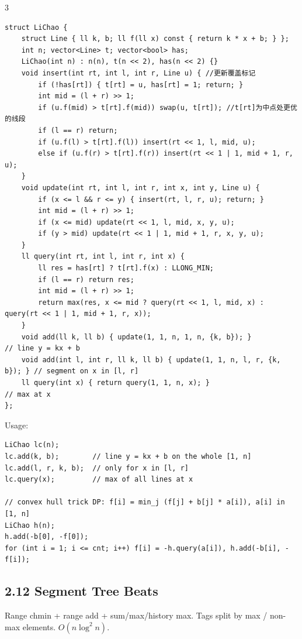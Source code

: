 \documentclass[8pt]{extarticle}
\begin{document}
\begin{multicols*}{3}
\begin{lstlisting}
struct LiChao {
    struct Line { ll k, b; ll f(ll x) const { return k * x + b; } };
    int n; vector<Line> t; vector<bool> has;
    LiChao(int n) : n(n), t(n << 2), has(n << 2) {}
    void insert(int rt, int l, int r, Line u) { //更新覆盖标记
        if (!has[rt]) { t[rt] = u, has[rt] = 1; return; }
        int mid = (l + r) >> 1;
        if (u.f(mid) > t[rt].f(mid)) swap(u, t[rt]); //t[rt]为中点处更优的线段
        if (l == r) return;
        if (u.f(l) > t[rt].f(l)) insert(rt << 1, l, mid, u);
        else if (u.f(r) > t[rt].f(r)) insert(rt << 1 | 1, mid + 1, r, u);
    }
    void update(int rt, int l, int r, int x, int y, Line u) {
        if (x <= l && r <= y) { insert(rt, l, r, u); return; }
        int mid = (l + r) >> 1;
        if (x <= mid) update(rt << 1, l, mid, x, y, u);
        if (y > mid) update(rt << 1 | 1, mid + 1, r, x, y, u);
    }
    ll query(int rt, int l, int r, int x) {
        ll res = has[rt] ? t[rt].f(x) : LLONG_MIN;
        if (l == r) return res;
        int mid = (l + r) >> 1;
        return max(res, x <= mid ? query(rt << 1, l, mid, x) : query(rt << 1 | 1, mid + 1, r, x));
    }
    void add(ll k, ll b) { update(1, 1, n, 1, n, {k, b}); }               // line y = kx + b
    void add(int l, int r, ll k, ll b) { update(1, 1, n, l, r, {k, b}); } // segment on x in [l, r]
    ll query(int x) { return query(1, 1, n, x); }                          // max at x
};
\end{lstlisting}

Usage:

\begin{lstlisting}
LiChao lc(n);
lc.add(k, b);        // line y = kx + b on the whole [1, n]
lc.add(l, r, k, b);  // only for x in [l, r]
lc.query(x);         // max of all lines at x

// convex hull trick DP: f[i] = min_j (f[j] + b[j] * a[i]), a[i] in [1, n]
LiChao h(n);
h.add(-b[0], -f[0]);
for (int i = 1; i <= cnt; i++) f[i] = -h.query(a[i]), h.add(-b[i], -f[i]);
\end{lstlisting}

\subsection*{2.12 Segment Tree Beats}

Range chmin + range add + sum/max/history max. Tags split by max / non-max elements. $O(n \log^2 n)$.


\end{multicols*}
\end{document}

